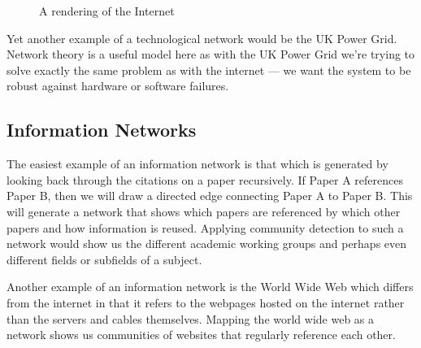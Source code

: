 \begin{figure}
    \begin{center}
    \end{center}
    \caption{A rendering of the Internet}
    \label{fig:internet}
\end{figure}

Yet another example of a technological network would be the UK Power Grid. Network theory is a useful model here as with the UK Power Grid we're trying to solve exactly the same problem as with the internet --- we want the system to be robust against hardware or software failures.

\subsection{Information Networks}\label{sec:Information Networks}
The easiest example of an information network is that which is generated by looking back through the citations on a paper recursively. If Paper A references Paper B, then we will draw a directed edge connecting Paper A to Paper B. This will generate a network that shows which papers are referenced by which other papers and how information is reused. Applying community detection to such a network would show us the different academic working groups and perhaps even different fields or subfields of a subject.

Another example of an information network is the World Wide Web which differs from the internet in that it refers to the webpages hosted on the internet rather than the servers and cables themselves. Mapping the world wide web as a network shows us communities of websites that regularly reference each other.

